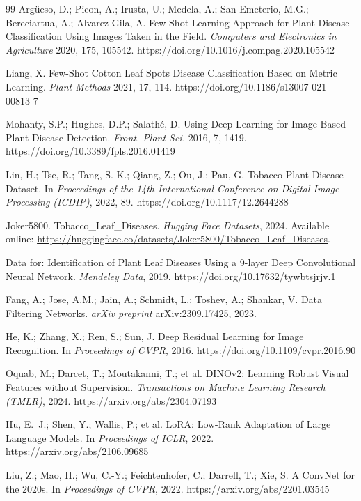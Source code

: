 \documentclass[10pt,a4paper]{article}
\begin{document}
\begin{thebibliography}{99}
Argüeso, D.; Picon, A.; Irusta, U.; Medela, A.; San-Emeterio, M.G.; Bereciartua, A.; Alvarez-Gila, A.
Few-Shot Learning Approach for Plant Disease Classification Using Images Taken in the Field.
\emph{Computers and Electronics in Agriculture} 2020, 175, 105542.
https://doi.org/10.1016/j.compag.2020.105542

Liang, X.
Few-Shot Cotton Leaf Spots Disease Classification Based on Metric Learning.
\emph{Plant Methods} 2021, 17, 114.
https://doi.org/10.1186/s13007-021-00813-7

Mohanty, S.P.; Hughes, D.P.; Salathé, D.
Using Deep Learning for Image-Based Plant Disease Detection.
\emph{Front. Plant Sci.} 2016, 7, 1419.
https://doi.org/10.3389/fpls.2016.01419

Lin, H.; Tse, R.; Tang, S.-K.; Qiang, Z.; Ou, J.; Pau, G.
Tobacco Plant Disease Dataset.
In \emph{Proceedings of the 14th International Conference on Digital Image Processing (ICDIP)}, 2022, 89.
https://doi.org/10.1117/12.2644288

Joker5800.
Tobacco\_Leaf\_Diseases.
\emph{Hugging Face Datasets}, 2024.
Available online: \url{https://huggingface.co/datasets/Joker5800/Tobacco_Leaf_Diseases}.

Data for: Identification of Plant Leaf Diseases Using a 9-layer Deep Convolutional Neural Network.
\emph{Mendeley Data}, 2019.
https://doi.org/10.17632/tywbtsjrjv.1

Fang, A.; Jose, A.M.; Jain, A.; Schmidt, L.; Toshev, A.; Shankar, V.
Data Filtering Networks.
\emph{arXiv preprint} arXiv:2309.17425, 2023.

He, K.; Zhang, X.; Ren, S.; Sun, J.
Deep Residual Learning for Image Recognition.
In \emph{Proceedings of CVPR}, 2016.
https://doi.org/10.1109/cvpr.2016.90

Oquab, M.; Darcet, T.; Moutakanni, T.; et al.
DINOv2: Learning Robust Visual Features without Supervision.
\emph{Transactions on Machine Learning Research (TMLR)}, 2024.
https://arxiv.org/abs/2304.07193

Hu, E.~J.; Shen, Y.; Wallis, P.; et al.
LoRA: Low-Rank Adaptation of Large Language Models.
In \emph{Proceedings of ICLR}, 2022.
https://arxiv.org/abs/2106.09685

Liu, Z.; Mao, H.; Wu, C.-Y.; Feichtenhofer, C.; Darrell, T.; Xie, S.
A ConvNet for the 2020s.
In \emph{Proceedings of CVPR}, 2022.
https://arxiv.org/abs/2201.03545

\end{thebibliography}
\end{document}
